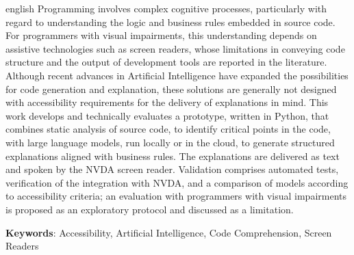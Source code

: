 \documentclass[
    12pt,                   %
    openright,              %
    oneside,                %
    a4paper,                %
    sumario=tradicional,    %
    english,                %
    brazil,                 %
    ]{abntex2}
\begin{document}
\begin{resumo}[Abstract]
\begin{otherlanguage*}{english}
  \noindent
  Programming involves complex cognitive processes, particularly with regard to understanding the logic and business rules embedded in source code. For programmers with visual impairments, this understanding depends on assistive technologies such as screen readers, whose limitations in conveying code structure and the output of development tools are reported in the literature. Although recent advances in Artificial Intelligence have expanded the possibilities for code generation and explanation, these solutions are generally not designed with accessibility requirements for the delivery of explanations in mind. This work develops and technically evaluates a prototype, written in Python, that combines static analysis of source code, to identify critical points in the code, with large language models, run locally or in the cloud, to generate structured explanations aligned with business rules. The explanations are delivered as text and spoken by the NVDA screen reader. Validation comprises automated tests, verification of the integration with NVDA, and a comparison of models according to accessibility criteria; an evaluation with programmers with visual impairments is proposed as an exploratory protocol and discussed as a limitation.
  \vspace{\onelineskip}

  \noindent
  \textbf{Keywords}: Accessibility, Artificial Intelligence, Code Comprehension, Screen Readers
 \end{otherlanguage*}
\end{resumo}

\listoffigures*
\cleardoublepage

\cleardoublepage


\end{document}
